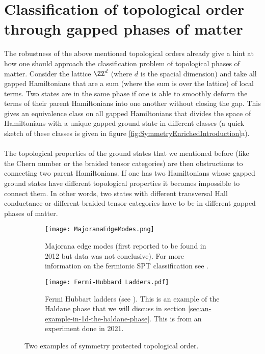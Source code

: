 \section{Classification of topological order through gapped phases of matter}
The robustness of the above mentioned topological orders already give a hint at how one should approach the classification problem of topological phases of matter. Consider the lattice $\ZZ^d$ (where $d$ is the spacial dimension) and take all gapped Hamiltonians that are a sum (where the sum is over the lattice) of local terms. Two states are in the same phase if one is able to smoothly deform the terms of their parent Hamiltonians into one another without closing the gap. This gives an equivalence class on all gapped Hamiltonians that divides the space of Hamiltonians with a unique gapped ground state in different classes (a quick sketch of these classes is given in figure \ref{fig:SymmetryEnrichedIntroduction}a).
\\\\
The topological properties of the ground states that we mentioned before (like the Chern number or the braided tensor categories) are then obstructions to connecting two parent Hamiltonians. If one has two Hamiltonians whose gapped ground states have different topological properties it becomes impossible to connect them. In other words, two states with different transversal Hall conductance or different braided tensor categories have to be in different gapped phases of matter.
\begin{figure}
	\begin{subfigure}[b]{0.45\textwidth}
		\centering
		\texttt{[image: MajoranaEdgeModes.png]}
		\caption{Majorana edge modes (first reported to be found in 2012 but data was not conclusive). For more information on the fermionic SPT classification see \cite{Bourne_2021}.}
	\end{subfigure}
	\hfil
	\begin{subfigure}[b]{0.45\textwidth}
		\centering
		\texttt{[image: Fermi-Hubbard Ladders.pdf]}
		\caption{Fermi Hubbart ladders (see \cite{sompet2022realizing}). This is an example of the Haldane phase that we will discuss in section \ref{sec:an-example-in-1d-the-haldane-phase}. This is from an experiment done in 2021.}
	\end{subfigure}
	\caption{Two examples of symmetry protected topological order.}
	\label{fig:SymmetryProtectedTopologicalOrderFigures}
\end{figure}
